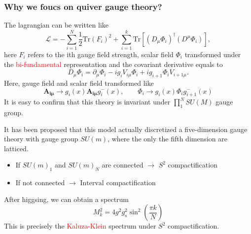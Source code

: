 \documentclass{beamer}
\begin{document}
\begin{frame}
    \frametitle{Why we foucs on quiver gauge theory?}
    The lagrangian can be written like
    \begin{equation*}
        \mathcal{L}=-\sum_{i=1}^{N}\frac{1}{2}\mathrm{Tr}(F_i)^2+\sum_{i=1}^{k}\mathrm{Tr}[(D_\mu\Phi_i)^\dagger(D^\mu\Phi_i)],
    \end{equation*}
    here $F_i$ refers to the ith gauge field strength, scalar field $\Phi_i$ transformed under the \textcolor{red}{bi-fundamental} representation and the covariant derivative equals to
    \begin{equation*}
        D_\mu \Phi_i=\partial_\mu \Phi_i -ig_iV_{i\mu}\Phi_i+ig_{i+1}\Phi_i V_{i+1\mu}.
    \end{equation*}
    Here, gauge field and scalar field transformed like
    \begin{equation*}
        \bm{A_{i\mu}}\rightarrow g_i(x) \bm{A_{i\mu}} g_i^-(x),\qquad \Phi_i\rightarrow g_i(x)\Phi_i g_{i+1}^-(x)
    \end{equation*}
    It is easy to confirm that this theory is invariant under $\prod_1^N SU(M)$ gauge group.
\end{frame}
\begin{frame}
    It has been proposed that this model actually discretized a five-dimension gauge theory with gauge group $SU(m)$, where the 
    only the fifth dimension are latticed.
    \begin{itemize}
        \item If $SU(m)_1$ and $SU(m)_N$ are connected $\longrightarrow$ $S^2$ compactification
        \item If not connected $\longrightarrow$ $\mathrm{Interval}$ compactification
    \end{itemize}
    After higgsing, we can obtain a spectrum
    \begin{equation*}
        M_k^2=4g^2g_s^2\sin^2\left(\frac{\pi k}{N}\right)
    \end{equation*}
    This is precisely the \textcolor{red}{Kaluza-Klein} spectrum under $S^2$ compactification.
\end{frame}
\end{document}
